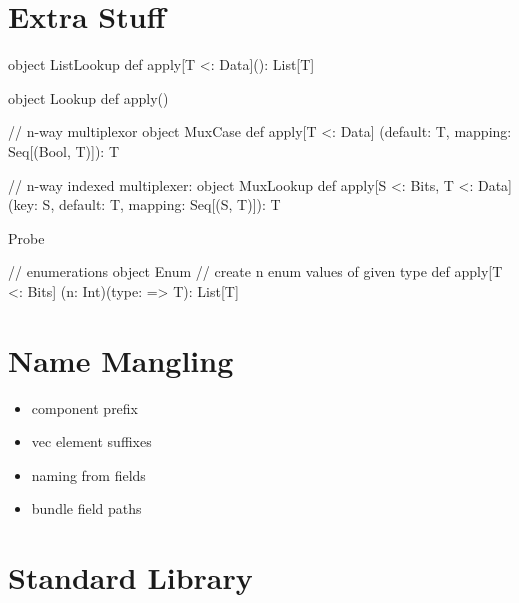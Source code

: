 \documentclass[10pt,twocolumn]{article}
\begin{document}
\section{Extra Stuff}

\lstset{language=scala}

\begin{scala}
object ListLookup {
  def apply[T <: Data](): List[T]
}

object Lookup {
  def apply()
}

// n-way multiplexor
object MuxCase {
  def apply[T <: Data] 
    (default: T, mapping: Seq[(Bool, T)]): T
}

// n-way indexed multiplexer:
object MuxLookup {
  def apply[S <: Bits, T <: Data] 
    (key: S, default: T, mapping: Seq[(S, T)]): T
}
\end{scala}

\begin{scala}
Probe
\end{scala}

\begin{scala}
// enumerations 
object Enum {
  // create n enum values of given type
  def apply[T <: Bits]
    (n: Int)(type: => T): List[T]
}
\end{scala}

\section{Name Mangling}

\begin{itemize}
\item component prefix
\item vec element suffixes
\item naming from fields
\item bundle field paths
\end{itemize}

\section{Standard Library}
\end{document}
